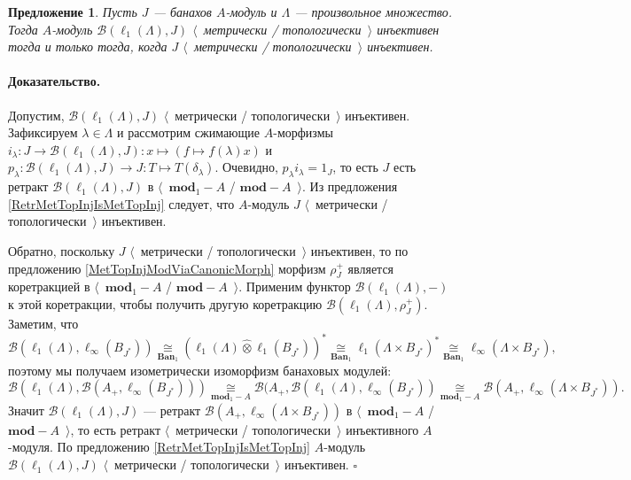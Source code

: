 \documentclass[12pt]{article}
\newcommand{\projtens}{\mathbin{\widehat{\otimes}}}
\newcommand{\isom}[1]{\mathop{\mathbin{\cong}}\limits_{#1}}
\newtheorem{proposition}[theorem]{Предложение}
\renewenvironment{proof}{\paragraph{Доказательство.}}{\hfill$\square$\medskip}
\begin{document}
\begin{proposition}\label{MapsFroml1toMetTopInj} Пусть $J$ --- банахов $A$-модуль и $\Lambda$ --- произвольное множество. Тогда $A$-модуль $\mathcal{B}(\ell_1(\Lambda),J)$ $\langle$~метрически / топологически~$\rangle$ инъективен тогда и только тогда, когда $J$ $\langle$~метрически / топологически~$\rangle$ инъективен.
\end{proposition}
\begin{proof} 
Допустим, $\mathcal{B}(\ell_1(\Lambda), J)$  $\langle$~метрически / топологически~$\rangle$ инъективен. Зафиксируем $\lambda\in\Lambda$ и рассмотрим сжимающие $A$-морфизмы $i_\lambda:J\to\mathcal{B}(\ell_1(\Lambda),J):x\mapsto(f\mapsto f(\lambda)x)$ и $p_\lambda:\mathcal{B}(\ell_1(\Lambda),J)\to J:T\mapsto T(\delta_\lambda)$. Очевидно, $p_\lambda i_\lambda=1_J$, то есть $J$ есть ретракт $\mathcal{B}(\ell_1(\Lambda),J)$ в $\langle$~$\mathbf{mod}_1-A$ / $\mathbf{mod}-A$~$\rangle$. Из предложения \ref{RetrMetTopInjIsMetTopInj} следует, что $A$-модуль $J$ $\langle$~метрически / топологически~$\rangle$ инъективен.

Обратно, поскольку $J$ $\langle$~метрически / топологически~$\rangle$ инъективен, то по предложению \ref{MetTopInjModViaCanonicMorph} морфизм $\rho_J^+$ является коретракцией в $\langle$~$\mathbf{mod}_1-A$ / $\mathbf{mod}-A$~$\rangle$. Применим функтор $\mathcal{B}(\ell_1(\Lambda),-)$ к этой коретракции, чтобы получить другую коретракцию $\mathcal{B}(\ell_1(\Lambda),\rho_J^+)$. Заметим, что 
$$
\mathcal{B}(\ell_1(\Lambda),\ell_\infty(B_{J^*}))\isom{\mathbf{Ban}_1}(\ell_1(\Lambda)\projtens \ell_1(B_{J^*}))^*\isom{\mathbf{Ban}_1}\ell_1(\Lambda\times B_{J^*})^*\isom{\mathbf{Ban}_1}\ell_\infty(\Lambda\times B_{J^*}),
$$ 
поэтому мы получаем изометрически изоморфизм банаховых модулей: 
$$
\mathcal{B}(\ell_1(\Lambda),\mathcal{B}(A_+,\ell_\infty(B_{J^*})))\isom{\mathbf{mod}_1-A}\mathcal{B}(A_+,\mathcal{B}(\ell_1(\Lambda),\ell_\infty(B_{J^*}))\isom{\mathbf{mod}_1-A}\mathcal{B}(A_+,\ell_\infty(\Lambda\times B_{J^*})).
$$ 
Значит $\mathcal{B}(\ell_1(\Lambda),J)$ --- ретракт $\mathcal{B}(A_+,\ell_\infty(\Lambda\times B_{J^*}))$ в $\langle$~$\mathbf{mod}_1-A$ / $\mathbf{mod}-A$~$\rangle$, то есть ретракт $\langle$~метрически / топологически~$\rangle$ инъективного $A$-модуля. По предложению \ref{RetrMetTopInjIsMetTopInj} $A$-модуль $\mathcal{B}(\ell_1(\Lambda), J)$ $\langle$~метрически / топологически~$\rangle$ инъективен.
\end{proof}

\end{document}
